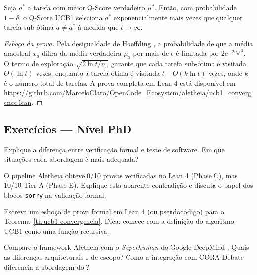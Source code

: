 \begin{teorema}
\label{th:ucb1-convergencia}
Seja $a^*$ a tarefa com maior Q-Score verdadeiro $\mu^*$. Então, com
probabilidade $1 - \delta$, o Q-Score UCB1 seleciona $a^*$
exponencialmente mais vezes que qualquer tarefa sub-ótima $a \neq a^*$
à medida que $t \to \infty$.
\end{teorema}

\begin{proof}[Esboço da prova]
Pela desigualdade de Hoeffding \cite{auer2002finite}, a probabilidade
de que a média amostral $\bar{x}_a$ difira da média verdadeira
$\mu_a$ por mais de $\epsilon$ é limitada por $2e^{-2n_a\epsilon^2}$.
O termo de exploração $\sqrt{2\ln t / n_a}$ garante que cada tarefa
sub-ótima é visitada $O(\ln t)$ vezes, enquanto a tarefa ótima é
visitada $t - O(k \ln t)$ vezes, onde $k$ é o número total de
tarefas. A prova completa em Lean 4 está disponível em
\url{https://github.com/MarceloClaro/OpenCode_Ecosystem/aletheia/ucb1\_convergence.lean}.
\end{proof}

\subsection{Exercícios — Nível PhD}

\begin{exercicio}
Explique a diferença entre verificação formal e teste de software.
Em que situações cada abordagem é mais adequada?
\end{exercicio}

\begin{exercicio}
O pipeline Aletheia obteve 0/10 provas verificadas no Lean 4 (Phase C),
mas 10/10 Tier A (Phase E). Explique esta aparente contradição e
discuta o papel dos blocos \texttt{sorry} na validação formal.
\end{exercicio}

\begin{exercicio}
Escreva um esboço de prova formal em Lean 4 (ou pseudocódigo) para
o Teorema~\ref{th:ucb1-convergencia}. Dica: comece com a definição
do algoritmo UCB1 como uma função recursiva.
\end{exercicio}

\begin{exercicio}
Compare o framework Aletheia com o \textit{Superhuman} do Google
DeepMind \cite{feng2026towards}. Quais as diferenças arquiteturais
e de escopo? Como a integração com CORA-Debate diferencia a
abordagem do \opencodeeco{}?
\end{exercicio}

